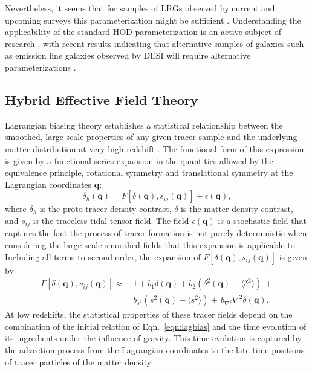 \documentclass[fleqn,usenatbib]{mnras}
\newcommand{\bq}{\boldsymbol q}
\begin{document}
Nevertheless, it seems that for samples of LRGs observed by current and upcoming surveys this parameterization might be sufficient \citep[however, see \citet{yuan2021abacushod} for further discussion on this topic]{zacharegkas2021dark}. Understanding the applicability of the standard HOD parameterization is an active subject of research \citep{Hadzhiyska_2020}, with recent results indicating that alternative samples of galaxies such as emission line galaxies observed by DESI will require alternative parameterizations \citep{Hadzhiyska_2021}.
\par 

\subsection{Hybrid Effective Field Theory}
\label{subsec:HEFT}
Lagrangian biasing theory establishes a statistical relationship between the smoothed, large-scale properties of any given tracer sample and the underlying matter distribution at very high redshift \citep{Matsubara2008}. The functional form of this expression is given by a functional series expansion in the quantities allowed by the equivalence principle, rotational symmetry and translational symmetry at the Lagrangian coordinates $\bq$:
\begin{equation}
\label{eqn:lagbias}
    \delta_h (\bq) = F[\delta (\bq), s_{ij}(\bq)] + \epsilon(\bq),
\end{equation}
where $\delta_h$ is the proto-tracer density contrast, $\delta$ is the matter density contrast, and $s_{ij}$ is the traceless tidal tensor field. The field $\epsilon(\bq)$ is a stochastic field that captures the fact the process of tracer formation is not purely deterministic when considering the large-scale smoothed fields that this expansion is applicable to. Including all terms to second order, the expansion of $F[\delta(\bq), s_{ij}(\bq)]$ is given by \citep{Vlah_2016}
\begin{align}
\label{eqn:secondorder}
F[\delta (\bq), s_{ij}(\bq)]  \approx\, &1 + b_1 \delta (\boldsymbol{q}) + b_2 (\delta^2(\boldsymbol{q}) - \langle \delta^2 \rangle )\,+\\
\nonumber & b_{s^2} (s^2(\boldsymbol{q}) - \langle s^2 \rangle)+ \,b_{\nabla^2}\nabla^2 \delta(\boldsymbol{q}) .
\end{align}
At low redshifts, the statistical properties of these tracer fields depend on the combination of the initial relation of Eqn.~\ref{eqn:lagbias} and the time evolution of its ingredients under the influence of gravity. This time evolution is captured by the advection process from the Lagrangian coordinates to the late-time positions of tracer particles of the matter density
\end{document}
